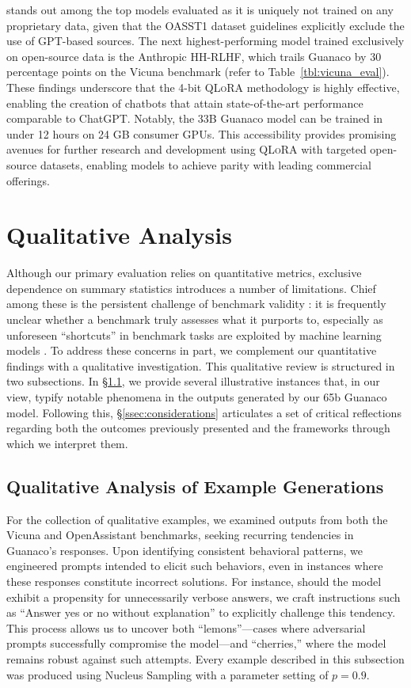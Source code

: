  stands out among the top models evaluated as it is uniquely not trained on any proprietary data, given that the OASST1 dataset guidelines explicitly exclude the use of GPT-based sources. The next highest-performing model trained exclusively on open-source data is the Anthropic HH-RLHF, which trails {Guanaco} by 30 percentage points on the Vicuna benchmark (refer to Table~\ref{tbl:vicuna_eval}). These findings underscore that the 4-bit \textsc{QLoRA} methodology is highly effective, enabling the creation of chatbots that attain state-of-the-art performance comparable to ChatGPT. Notably, the 33B {Guanaco} model can be trained in under 12 hours on 24 GB consumer GPUs. This accessibility provides promising avenues for further research and development using \textsc{QLoRA} with targeted open-source datasets, enabling models to achieve parity with leading commercial offerings.

\section{Qualitative Analysis}

Although our primary evaluation relies on quantitative metrics, exclusive dependence on summary statistics introduces a number of limitations. Chief among these is the persistent challenge of benchmark validity \citep{liao2021we}: it is frequently unclear whether a benchmark truly assesses what it purports to, especially as unforeseen ``shortcuts'' in benchmark tasks are exploited by machine learning models \citep{gururangan2018annotation, poliak2018hypothesis}. To address these concerns in part, we complement our quantitative findings with a qualitative investigation. This qualitative review is structured in two subsections. In \S\ref{ssec:examples}, we provide several illustrative instances that, in our view, typify notable phenomena in the outputs generated by our 65b {Guanaco} model. Following this, \S\ref{ssec:considerations} articulates a set of critical reflections regarding both the outcomes previously presented and the frameworks through which we interpret them.

\subsection{Qualitative Analysis of Example Generations}
\label{ssec:examples}

For the collection of qualitative examples, we examined outputs from both the Vicuna and OpenAssistant benchmarks, seeking recurring tendencies in {Guanaco}'s responses. Upon identifying consistent behavioral patterns, we engineered prompts intended to elicit such behaviors, even in instances where these responses constitute incorrect solutions. For instance, should the model exhibit a propensity for unnecessarily verbose answers, we craft instructions such as ``Answer yes or no without explanation'' to explicitly challenge this tendency. This process allows us to uncover both ``lemons''—cases where adversarial prompts successfully compromise the model—and ``cherries,'' where the model remains robust against such attempts. Every example described in this subsection was produced using Nucleus Sampling \cite{holtzmancurious} with a parameter setting of $p=0.9$.

